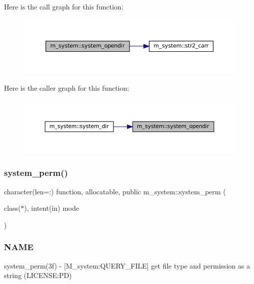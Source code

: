Here is the call graph for this function\+:\nopagebreak
\begin{figure}[H]
\begin{center}
\leavevmode
\includegraphics[width=350pt]{namespacem__system_a622cc67c03e8cdea1d4c2430bb36081b_cgraph}
\end{center}
\end{figure}
Here is the caller graph for this function\+:\nopagebreak
\begin{figure}[H]
\begin{center}
\leavevmode
\includegraphics[width=350pt]{namespacem__system_a622cc67c03e8cdea1d4c2430bb36081b_icgraph}
\end{center}
\end{figure}
\mbox{\label{namespacem__system_ae8f39e1d4e420396319105e4e81f92b5}} 
\subsubsection{\texorpdfstring{system\+\_\+perm()}{system\_perm()}}
{\footnotesize\ttfamily character(len=\+:) function, allocatable, public m\+\_\+system\+::system\+\_\+perm (\begin{DoxyParamCaption}\item[{class($\ast$), intent(in)}]{mode }\end{DoxyParamCaption})}



\subsubsection*{N\+A\+ME}

system\+\_\+perm(3f) -\/ \mbox{[}M\+\_\+system\+:Q\+U\+E\+R\+Y\+\_\+\+F\+I\+LE\mbox{]} get file type and permission as a string (L\+I\+C\+E\+N\+SE\+:PD) 

